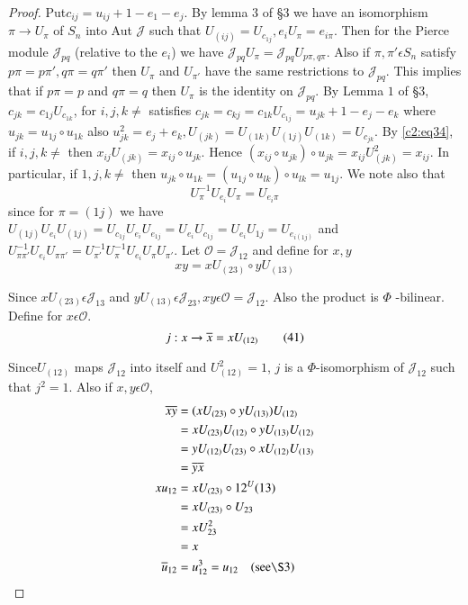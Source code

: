 \begin{proof}
Put\pageoriginale $c_{ij}=u_{ij}+1-e_1-e_j$. By lemma $3$ of \S 3 we have an
isomorphism $\pi \to U_{\pi}$ of $S_n$ into Aut $\mathscr{J}$ such
that $U_{(ij)}=U_{c_{1j}},e_iU_{\pi}= e_{i \pi}$. Then for the Pierce module
$\mathscr{J}_{pq}$ (relative to the $e_i$) we have
$\mathscr{J}_{pq}U_{\pi}=\mathscr{J}_{pq}U_{p\pi,q\pi}$. Also if $\pi,
\pi' \epsilon S_n$ satisfy $p{\pi}=p{\pi'}, q{\pi}= q \pi'$ then $U_{\pi}$
and $U_{\pi'}$ have the same restrictions to $\mathscr{J}_{pq}$. This
implies that if $p\pi=p$ and $q\pi=q$ then $U_{\pi}$ is the identity
on $\mathscr{J}_{pq}$. By Lemma $1$ of \S $3$, $c_{jk}=c_{1j}
U_{c_{1k}}$, for $i,j,k\neq$ satisfies
$c_{jk}=c_{kj}=c_{1k}U_{c_{1j}}=u_{jk}+1-e_j-e_k$ where
$u_{jk}=u_{1j}\circ u_{1k}$ also $u^{2}_{jk}=e_j+ e_k,
U_{(jk)}=U_{(1k)}U_{(1j)}U_{(1k)}=U_{c_{jk}}$. By \eqref{c2:eq34}, if $i,j,k\neq$
then $x_{ij}U_{(jk)}=x_{ij}\circ u_{jk}$. Hence $(x_{ij}\circ
u_{jk})\circ u_{jk}= x_{ij}U^{2}_{(jk)}=x_{ij}$. In particular, if
$1,j,k\neq$ then $u_{jk}\circ u_{1k}=(u_{1j}\circ u_{lk})\circ
u_{lk}=u_{1j}$. We note also that
\begin{equation*}
  U^{-1}_{\pi}U_{e_{i}}U_{\pi}=U_{e_{i}\pi} \tag{39}\label{c2:eq39}
\end{equation*}
since for $\pi=(1j)$ we have
$U_{(1j)}U_{e_{i}}U_{(1j)}=U_{c_{1j}}U_{e_{i}}U_{e_{1j}}=U_{e_{i}}U_{c_{1j}}=
U_{e_{i}}U_{1j}=U_{e_{i(1j)}}$ and $U^{-1}_{\pi\pi'}
U_{e_{i}}U_{\pi\pi'}=U^{-1}_{\pi'}U^{-1}_{\pi}U_{e_{i}}U_{\pi}U_{\pi'}$.
Let $\mathscr{O}=\mathscr{J}_{12}$ and define for $x,y$
\begin{equation*}
xy=xU_{(23)}\circ yU_{(13)}\tag{40}\label{c2:eq40}
\end{equation*}

Since $xU_{(23)}\epsilon \mathscr{J}_{13}$ and $yU_{(13)}\epsilon
\mathscr{J}_{23},xy\epsilon \mathscr{O}=\mathscr{J}_{12}$. Also the
product is $\Phi$ -bilinear. Define for $x\epsilon \mathscr{O}$.
\begin{equation*}
  j:x\to \overline{x}=xU_{(12)}\tag{41}\label{c2:eq41}
\end{equation*}

Since\pageoriginale $U_{(12)}$ maps $\mathscr{J}_{12}$ into itself and
$U^{2}_{(12)}=1$, $j$ is a $\Phi$-isomorphism of $\mathscr{J}_{12}$ such
that $j^{2}=1$. Also if $x,y\epsilon \mathscr{O}$,
\begin{align*}
  \ob{xy}&=(xU_{(23)}\circ y U_{(13)})U_{(12)}\\
  &=x U_{(23)}U_{(12)}\circ yU_{(13)}U_{(12)}\\
  &=y U_{(12)}U_{(23)}\circ x U_{(12)}U_{(13)}\\
  &=\ob{y}\ob{x}\\
  xu_{12}&=xU_{(23)}\circ 12^{U}(13)\\
  &=xU_{(23)}\circ U_{23}\\
  &=xU^{2}_{23}\\
  &=x\\
  \ob{u}_{12}&=u^{3}_{12}=u_{12}\quad (\text{see} \S 3)
\end{align*}


\end{proof}
